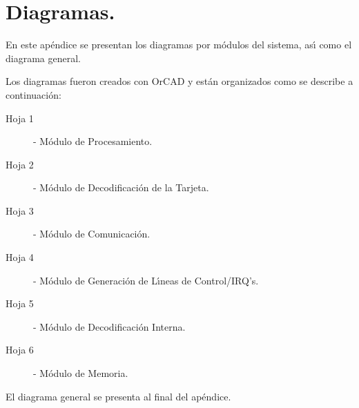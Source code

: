 \chapter[Diagramas.]{Diagramas.}
\label{Apendice:diagramas}


\fancyhead[LE,RO]{\thepage}


En este ap\'endice se presentan los diagramas por m\'odulos del sistema, as\'{\i} como el %
diagrama general.

Los diagramas fueron creados con OrCAD y est\'an organizados como se describe a continuaci\'on:

\begin{description}
\item[Hoja 1] - M\'odulo de Procesamiento.
\item[Hoja 2] - M\'odulo de Decodificaci\'on de la Tarjeta.
\item[Hoja 3] - M\'odulo de Comunicaci\'on.
\item[Hoja 4] - M\'odulo de Generaci\'on de L\'{\i}neas de Control/IRQ's.
\item[Hoja 5] - M\'odulo de Decodificaci\'on Interna.
\item[Hoja 6] - M\'odulo de Memoria.
\end{description}

El diagrama general se presenta al final del ap\'endice.


\cleardoublepage

